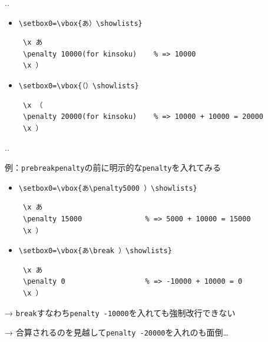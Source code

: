\documentclass[a5paper,dvipdfmx,14pt]{beamer}
\def\cs#1{\texttt{\char92\nobreak#1}}
\begin{document}
\begin{frame}[t,fragile]{\insertsectionnumber.\insertsubsectionnumber. \insertsubsection}{}
\pause
{\footnotesize\def\verbnotesize{\scriptsize}
\begin{itemize}
  \item \verb+\setbox0=\vbox{あ）\showlists}+
\begin{verbnote}
\begin{verbatim}
 \x あ
 \penalty 10000(for kinsoku)    % => 10000
 \x ）
\end{verbatim}
\end{verbnote}
\end{itemize}\vskip-20pt
\begin{itemize}
  \item \verb+\setbox0=\vbox{（）\showlists}+
\begin{verbnote}
\begin{verbatim}
 \x （
 \penalty 20000(for kinsoku)    % => 10000 + 10000 = 20000
 \x ）
\end{verbatim}
\end{verbnote}
\end{itemize}\vskip-20pt
}
\end{frame}

\begin{frame}[t,fragile]{\insertsectionnumber.\insertsubsectionnumber. \insertsubsection}{}
{\footnotesize\def\verbnotesize{\scriptsize}
例：\cs{prebreakpenalty}の前に明示的な\cs{penalty}を入れてみる
\begin{itemize}
  \item \verb+\setbox0=\vbox{あ\penalty5000 ）\showlists}+
\begin{verbnote}
\begin{verbatim}
 \x あ
 \penalty 15000               % => 5000 + 10000 = 15000
 \x ）
\end{verbatim}
\end{verbnote}
\end{itemize}\vskip-20pt
\pause
\begin{itemize}
  \item \verb+\setbox0=\vbox{あ\break ）\showlists}+
\begin{verbnote}
\begin{verbatim}
 \x あ
 \penalty 0                   % => -10000 + 10000 = 0
 \x ）
\end{verbatim}
\end{verbnote}
\end{itemize}\vskip-15pt
→ \cs{break}すなわち\cs{penalty -10000}を入れても強制改行できない{\SUSHI}\par\medskip
→ 合算されるのを見越して\cs{penalty -20000}を入れのも面倒{\SUSHI}…\par
}
\end{frame}
\end{document}
